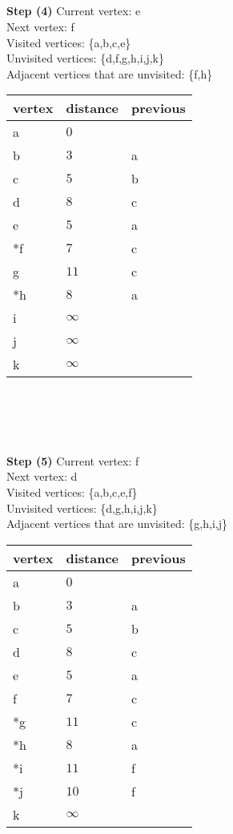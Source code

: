\documentclass[11pt]{article}
\begin{document}
\\ \\
\\ \\
\textbf{Step (4)} Current vertex: e\\
Next vertex: f\\
Visited vertices: \{a,b,c,e\}\\
Unvisited vertices: \{d,f,g,h,i,j,k\}\\
Adjacent vertices that are unvisited: \{f,h\}\\
\begin{tabular}{|l|l|l|}
    \hline
    vertex & distance & previous \\
    \hline
    a & $0$ &  \\
    \hline
    b & $3$ & a \\
    \hline
    c & $5$ & b \\
    \hline
    d & $8$ & c \\
    \hline
    e & $5$ & a \\
    \hline
    *f & $7$ & c \\
    \hline
    g & $11$ & c \\
    \hline
    *h & $8$ & a \\
    \hline
    i & $\infty$ &  \\
    \hline
    j & $\infty$ &  \\
    \hline
    k & $\infty$ &  \\
    \hline
\end{tabular}
\\ \\
\\ \\
\textbf{Step (5)} Current vertex: f\\
Next vertex: d\\
Visited vertices: \{a,b,c,e,f\}\\
Unvisited vertices: \{d,g,h,i,j,k\}\\
Adjacent vertices that are unvisited: \{g,h,i,j\}\\
\begin{tabular}{|l|l|l|}
    \hline
    vertex & distance & previous \\
    \hline
    a & $0$ &  \\
    \hline
    b & $3$ & a \\
    \hline
    c & $5$ & b \\
    \hline
    d & $8$ & c \\
    \hline
    e & $5$ & a \\
    \hline
    f & $7$ & c \\
    \hline
    *g & $11$ & c \\
    \hline
    *h & $8$ & a \\
    \hline
    *i & $11$ & f \\
    \hline
    *j & $10$ & f \\
    \hline
    k & $\infty$ &  \\
    \hline
\end{tabular}
\end{document}
